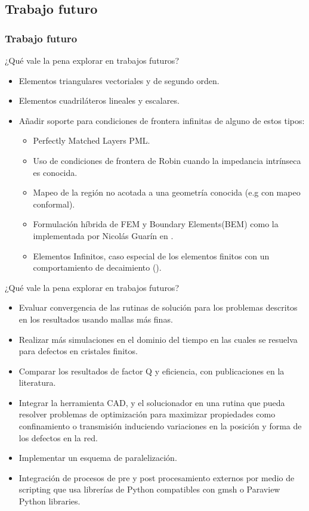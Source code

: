 \documentclass[xcolor=table,serif]{beamer}
\begin{document}
	\subsection{Trabajo futuro}
	\begin{frame}
		\frametitle{Trabajo futuro}
		¿Qué vale la pena explorar en trabajos futuros?		
		\begin{itemize}
		\pause
		\item Elementos triangulares vectoriales y de segundo orden.
		\pause		
		\item  Elementos cuadriláteros lineales y escalares.
		\pause
		\item Añadir soporte para condiciones de frontera infinitas de alguno de estos tipos:
		\begin{itemize}
			\pause
			\item  Perfectly Matched Layers PML\cite{Jin2010}. 
			\pause
			\item Uso de condiciones de frontera de Robin cuando la impedancia intrínseca es conocida.
			\pause
			\item Mapeo  de la región no acotada a una geometría conocida (e.g con mapeo conformal). \pause
		\item Formulación híbrida de  FEM y Boundary Elements(BEM) como la implementada por Nicol\'as Guar\'in en \cite{Guarin2012}.
		\pause
		\item Elementos Infinitos, caso especial de los elementos finitos con un comportamiento de decaimiento (\cite{Zienkiewicz2005}).
		\end{itemize} 
	\end{itemize}
	\end{frame}
	\begin{frame}
	¿Qué vale la pena explorar en trabajos futuros?
		\begin{itemize}
		\pause
		\item Evaluar convergencia de las rutinas de solución para los problemas descritos en los resultados usando mallas más finas.
		\pause
		\item Realizar más simulaciones en el dominio del tiempo en las cuales se resuelva para defectos en cristales finitos.
		\pause
		\item Comparar los resultados de factor Q y eficiencia, con publicaciones en la literatura.
		\pause
		\item Integrar la herramienta CAD, y el solucionador en una rutina que pueda resolver problemas de optimización para maximizar propiedades como confinamiento o transmisión induciendo variaciones en la posición y forma de los defectos en la red.
		\pause
		\item Implementar un esquema de paralelización.
		\pause
		\item Integración de procesos de pre y post procesamiento externos por medio de scripting que usa librerías de Python compatibles con gmsh o Paraview Python libraries.
		\end{itemize}
	\end{frame}
\end{document}
